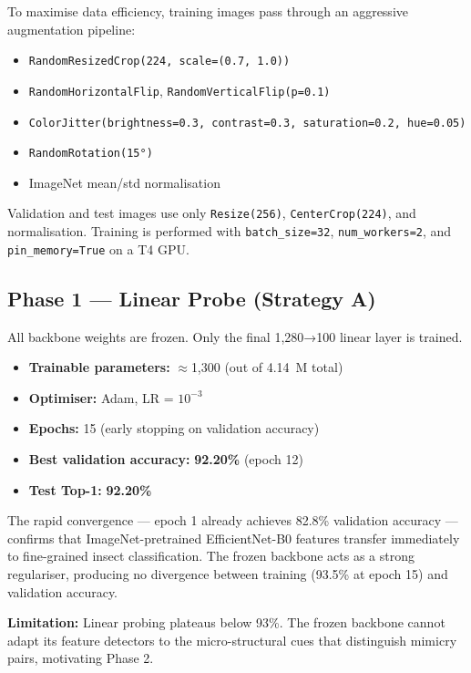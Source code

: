 \documentclass[journal, twocolumn]{IEEEtran}
\begin{document}
To maximise data efficiency, training images pass through an aggressive augmentation pipeline:
\begin{itemize}
    \item \texttt{RandomResizedCrop(224, scale=(0.7, 1.0))}
    \item \texttt{RandomHorizontalFlip}, \texttt{RandomVerticalFlip(p=0.1)}
    \item \texttt{ColorJitter(brightness=0.3, contrast=0.3, saturation=0.2, hue=0.05)}
    \item \texttt{RandomRotation(15°)}
    \item ImageNet mean/std normalisation
\end{itemize}

Validation and test images use only \texttt{Resize(256)}, \texttt{CenterCrop(224)}, and normalisation. Training is performed with \texttt{batch\_size=32}, \texttt{num\_workers=2}, and \texttt{pin\_memory=True} on a T4 GPU.

\subsection{Phase 1 — Linear Probe (Strategy A)}

All backbone weights are frozen. Only the final 1,280→100 linear layer is trained.

\begin{itemize}
    \item \textbf{Trainable parameters:} $\approx$1,300 (out of 4.14~M total)
    \item \textbf{Optimiser:} Adam, LR = $10^{-3}$
    \item \textbf{Epochs:} 15 (early stopping on validation accuracy)
    \item \textbf{Best validation accuracy:} \textbf{92.20\%} (epoch 12)
    \item \textbf{Test Top-1:} \textbf{92.20\%}
\end{itemize}

The rapid convergence — epoch 1 already achieves 82.8\% validation accuracy — confirms that ImageNet-pretrained EfficientNet-B0 features transfer immediately to fine-grained insect classification. The frozen backbone acts as a strong regulariser, producing no divergence between training (93.5\% at epoch 15) and validation accuracy.

\textbf{Limitation:} Linear probing plateaus below 93\%. The frozen backbone cannot adapt its feature detectors to the micro-structural cues that distinguish mimicry pairs, motivating Phase 2.
\end{document}
